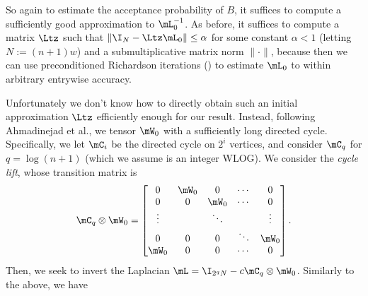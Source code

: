    So again to estimate the acceptance probability of $B$, it suffices to compute a sufficiently good approximation to $\mL_0^{-1}$.
   As before, it suffices to compute a matrix
   $\Ltz$ such that $\|\I_N-\Ltz \mL_0\| \leq \alpha$ for some constant $\alpha<1$ (letting $N:=(n+1)w$) and a submultiplicative matrix norm $\|\cdot\|$, because then we can use preconditioned Richardson iterations () to estimate $\mL_0$ to within arbitrary entrywise accuracy.
   
   Unfortunately %
%
%
%
%
   we don't know how to directly obtain such an initial approximation $\Ltz$ efficiently
enough for our result. Instead, following 
%
Ahmadinejad  %
et al., we tensor $\mW_0$ with a sufficiently long directed cycle.  Specifically, we let $\mC_i$ be the directed cycle on $2^i$ vertices, and consider $\mC_q$ for $q=\log(n+1)$ (which we assume is an integer WLOG). We consider the \emph{cycle lift}, whose transition matrix is
    $$\mC_q\otimes\mW_0 =
    \begin{bmatrix}
    0 & \mW_0 & 0 & \cdots & 0 \\
    0 & 0 & \mW_0 & \cdots & 0 \\
    \vdots & & \ddots & & \vdots\\
    0 & 0 & 0 & \ddots & \mW_0\\
    \mW_0 & 0 & 0 & \cdots &  0 \\
    \end{bmatrix}.$$  %
    Then, we seek to invert the Laplacian $\mL = \I_{2^qN} - c \mC_q \otimes \mW_0$.  Similarly
to the above, we have %

